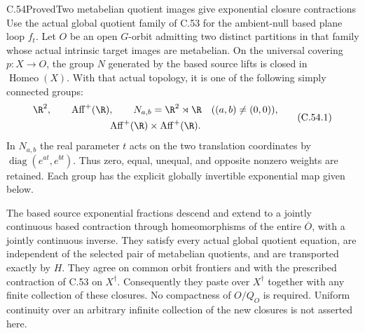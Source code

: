 \begin{claim}{C.54}{Proved}{Two metabelian quotient images give exponential closure contractions}
Use the actual global quotient family of C.53 for the
ambient-null based plane loop $f_t$.
Let $O$ be an open $G$-orbit admitting two distinct
partitions in that family whose actual intrinsic target
images are metabelian. On the universal covering
$p:X\to O$, the group $N$ generated by the based source
lifts is closed in $\operatorname{Homeo}(X)$.
With that actual topology, it is one of the following
simply connected groups:
\[
\begin{gathered}
 \R^2,\qquad \operatorname{Aff}^+(\R),\qquad
 N_{a,b}=\R^2\rtimes\R\quad((a,b)\ne(0,0)),\\
 \operatorname{Aff}^+(\R)\times\operatorname{Aff}^+(\R).
\end{gathered}                                           \tag{C.54.1}
\]
In $N_{a,b}$ the real parameter $t$ acts on the two
translation coordinates by
$\operatorname{diag}(e^{at},e^{bt})$.
Thus zero, equal, unequal, and opposite nonzero
weights are retained.
Each group has the explicit globally invertible
exponential map given below.

The based source exponential fractions descend and
extend to a jointly continuous based contraction
through homeomorphisms of the entire $\overline O$,
with a jointly continuous inverse.
They satisfy every actual global quotient equation,
are independent of the selected pair of metabelian
quotients, and are transported exactly by $H$.
They agree on common orbit frontiers and with the
prescribed contraction of C.53 on $X^\dagger$.
Consequently they paste over $X^\dagger$ together
with any finite collection of these closures.
No compactness of $O/Q_O$ is required.
Uniform continuity over an arbitrary infinite
collection of the new closures is not asserted here.
\end{claim}

